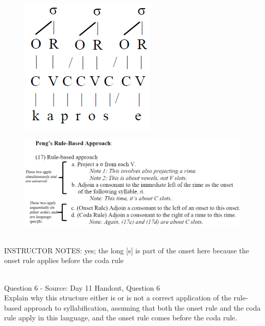 \documentclass[12pt]{article}
\begin{document}
\begin{figure}[H]
\includegraphics{../images/pengrules_kaprosse_yes.png}
\end{figure}
\begin{figure}[H]
\includegraphics{../images/peng_rules.png}
\end{figure}

~\\
INSTRUCTOR NOTES: yes; the long [s] is part of the onset here because the onset rule applies before the coda rule


~\\

{\large Question 6} - Source: Day 11 Handout, Question 6\\

Explain why this structure either is or is not a correct application of the rule-based approach to syllabification, assuming that both the onset rule and the coda rule apply in this language, and the onset rule comes before the coda rule.\\
\end{document}
